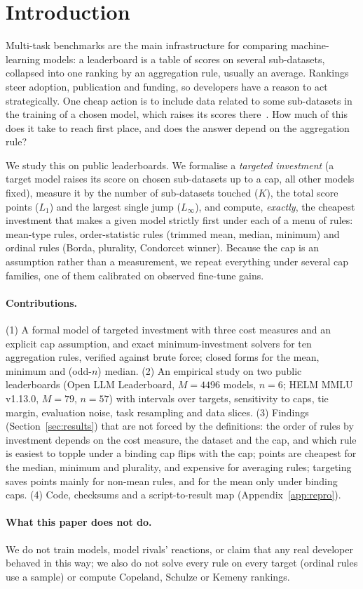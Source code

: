 \section{Introduction}
\label{sec:intro}
Multi-task benchmarks are the main infrastructure for comparing machine-learning models: a leaderboard is a table of scores on several sub-datasets, collapsed into one ranking by an aggregation rule, usually an average. Rankings steer adoption, publication and funding, so developers have a reason to act strategically. One cheap action is to include data related to some sub-datasets in the training of a chosen model, which raises its scores there~\citep{zhou2023cheater,yang2023rephrased}. How much of this does it take to reach first place, and does the answer depend on the aggregation rule?

We study this on public leaderboards. We formalise a \emph{targeted investment} (a target model raises its score on chosen sub-datasets up to a cap, all other models fixed), measure it by the number of sub-datasets touched ($K$), the total score points ($L_1$) and the largest single jump ($L_\infty$), and compute, \emph{exactly}, the cheapest investment that makes a given model strictly first under each of a menu of rules: mean-type rules, order-statistic rules (trimmed mean, median, minimum) and ordinal rules (Borda, plurality, Condorcet winner). Because the cap is an assumption rather than a measurement, we repeat everything under several cap families, one of them calibrated on observed fine-tune gains.

\paragraph{Contributions.}
(1) A formal model of targeted investment with three cost measures and an explicit cap assumption, and exact minimum-investment solvers for ten aggregation rules, verified against brute force; closed forms for the mean, minimum and (odd-$n$) median. (2) An empirical study on two public leaderboards (Open LLM Leaderboard, $M=4496$ models, $n=6$; HELM MMLU v1.13.0, $M=79$, $n=57$) with intervals over targets, sensitivity to caps, tie margin, evaluation noise, task resampling and data slices. (3) Findings (Section~\ref{sec:results}) that are not forced by the definitions: the order of rules by investment depends on the cost measure, the dataset and the cap, and which rule is easiest to topple under a binding cap flips with the cap; points are cheapest for the median, minimum and plurality, and expensive for averaging rules; targeting saves points mainly for non-mean rules, and for the mean only under binding caps. (4) Code, checksums and a script-to-result map (Appendix~\ref{app:repro}).

\paragraph{What this paper does not do.}
We do not train models, model rivals' reactions, or claim that any real developer behaved in this way; we also do not solve every rule on every target (ordinal rules use a sample) or compute Copeland, Schulze or Kemeny rankings.
